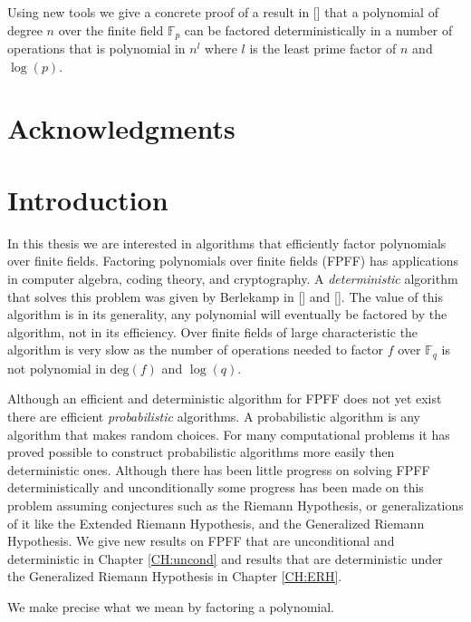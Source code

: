 \documentclass{article}
\let\chapter\section
\theoremstyle{plain}
\theoremstyle{definition}
\def\Fp {{ \mathbb{F} _ {p} }}
\def\Fq {{ \mathbb{F} _ {q} }}
\def\deg {{ \mathrm{deg}}}
\begin{document}
		Using new tools we give a concrete proof of a result in [] that a polynomial of degree $n$ over the finite field $\Fp$ can be factored deterministically in a number of operations that is polynomial in $n^l$ where $l$ is the least prime factor of $n$ and $\log(p)$. 

\pagebreak
\section*{Acknowledgments}

\pagebreak
{}
\tableofcontents

%
%
\newpage
\chapter{Introduction}
\label{CH:Introduction}
%
%
 
		In this thesis we are interested in algorithms that efficiently factor polynomials over finite fields. Factoring polynomials over finite fields (FPFF) has applications in computer algebra, coding theory, and cryptography.  A \emph{deterministic} algorithm that solves this problem was given by Berlekamp in [] and []. The value of this algorithm is in its generality, any polynomial will eventually be factored by the algorithm, not in its efficiency. Over finite fields of large characteristic the algorithm is very slow as the number of operations needed to factor $f$ over $\Fq$ is not polynomial in $\deg(f)$ and $\log(q)$.

		Although an efficient and deterministic algorithm for FPFF does not yet exist there are efficient \emph{probabilistic} algorithms. A probabilistic algorithm is any algorithm that makes random choices. For many computational problems it has proved possible to construct probabilistic algorithms more easily then deterministic ones. Although there has been little progress on solving FPFF deterministically and unconditionally some progress has been made on this problem assuming conjectures such as the Riemann Hypothesis, or generalizations of it like the Extended Riemann Hypothesis, and the Generalized Riemann Hypothesis. We give new results on FPFF that are unconditional and deterministic in Chapter \ref{CH:uncond} and results that are deterministic under the Generalized Riemann Hypothesis in Chapter \ref{CH:ERH}.

		We make precise what we mean by factoring a polynomial. 
\end{document}
